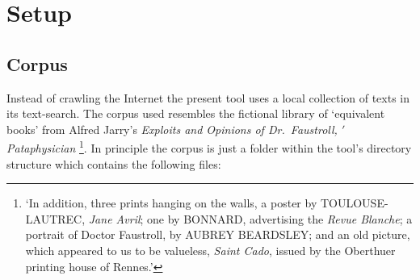 \section{Setup}

\subsection{Corpus}

Instead of crawling the Internet the present tool uses a local collection of texts in its text-search. The corpus used resembles the fictional library of `equivalent books' from Alfred Jarry's \emph{Exploits and Opinions of Dr.\ Faustroll, $'$Pataphysician} \citeyear[p.10-12]{Jarry1996}\footnote{`In addition, three prints hanging on the walls, a poster by TOULOUSE-LAUTREC, \emph{Jane Avril}; one by BONNARD, advertising the \emph{Revue Blanche}; a portrait of Doctor Faustroll, by AUBREY BEARDSLEY\@; and an old picture, which appeared to us to be valueless, \emph{Saint Cado}, issued by the Oberthuer printing house of Rennes.'\parencite[p.12]{Jarry1996}}. In principle the \hypertarget{corpus}{corpus}\label{ref:corpus} is just a folder within the tool's directory structure which contains the following files:

